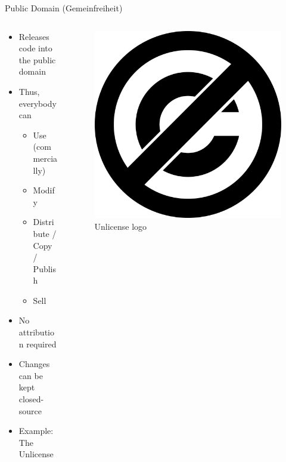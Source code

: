 \documentclass[compress,aspectratio=169]{beamer}
\begin{document}
  \begin{frame}{Public Domain (Gemeinfreiheit)}
    \begin{columns}
      \begin{column}{0.5\textwidth}
    \begin{itemize}
      \item Releases code into the public domain
      \item Thus, everybody can
        \begin{itemize}
          \item Use (commercially)
          \item Modify
          \item Distribute / Copy / Publish
          \item Sell
        \end{itemize}
      \item No attribution required
      \item Changes can be kept closed-source
      \item Example: The Unlicense \cite{unlicense}
    \end{itemize}
      \end{column}
      \begin{column}{0.5\textwidth}
        \begin{figure}
          \includegraphics[width=.5\textwidth]{./assets/unlicense.png}
          \caption{Unlicense logo \cite{unlicense}}
        \end{figure}
      \end{column}
    \end{columns}
  \end{frame}
\end{document}
